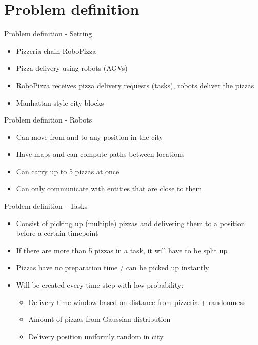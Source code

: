 \section{Problem definition}

\begin{frame}{Problem definition - Setting}
    \begin{itemize}
        \item Pizzeria chain RoboPizza
        \item Pizza delivery using robots (AGVs)
        \item RoboPizza receives pizza delivery requests (tasks), robots deliver the pizzas
        \item Manhattan style city blocks
    \end{itemize}
\end{frame}

\begin{frame}{Problem definition - Robots}
    \begin{itemize}
        \item Can move from and to any position in the city
        \item Have maps and can compute paths between locations
        \item Can carry up to 5 pizzas at once
        \item Can only communicate with entities that are close to them
    \end{itemize}
\end{frame}

\begin{frame}{Problem definition - Tasks}
    \begin{itemize}
        \item Consist of picking up (multiple) pizzas and delivering them to a position before a certain timepoint
        \item If there are more than 5 pizzas in a task, it will have to be split up
        \item Pizzas have no preparation time / can be picked up instantly
        \item Will be created every time step with low probability:
            \begin{itemize}
                \item Delivery time window based on distance from pizzeria + randomness
                \item Amount of pizzas from Gaussian distribution
                \item Delivery position uniformly random in city
            \end{itemize}
    \end{itemize}
\end{frame}

